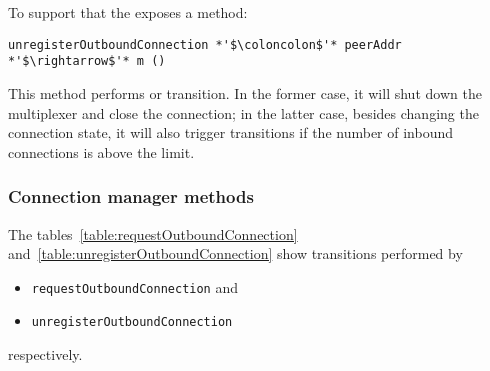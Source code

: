 To support that the \connmngr{} exposes a method:

\begin{lstlisting}
unregisterOutboundConnection *'$\coloncolon$'* peerAddr *'$\rightarrow$'* m ()
\end{lstlisting}
This method performs \DemotedToColdUniLoc{} or
\DemotedToColdDupLoc{} transition. In the former case, it will shut down the
multiplexer and close the \TCP{} connection; in the latter case, besides
changing the connection state, it will also trigger \Prune{} transitions if
the number of inbound connections is above the limit.

\subsubsection{Connection manager methods}

The tables~\ref{table:requestOutboundConnection}
and~\ref{table:unregisterOutboundConnection} show transitions performed by
\begin{itemize}
  \item \texttt{requestOutboundConnection} and
  \item \texttt{unregisterOutboundConnection}
\end{itemize}
respectively.

